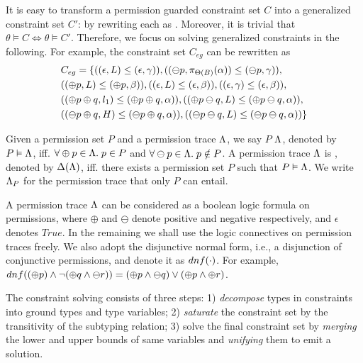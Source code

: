{{{It is easy to transform a permission guarded constraint set $C$ into a
generalized constraint set $C'$: by rewriting each  as .
Moreover, it is trivial that $\theta \vDash C \Longleftrightarrow \theta \vDash C'$.
Therefore, we focus on solving generalized constraints in the following.
For example, the constraint set $C_{eg}$ can be rewritten as
{\small
\begin{align*}
&C_{eg} = \{((\epsilon,L)\leq(\epsilon,\gamma)),
((\ominus p,\pi_{{\Theta(B)}}({\alpha}))\leq(\ominus p,\gamma)),\\
&((\oplus p,L)\leq(\oplus p,\beta)),
((\epsilon,L)\leq(\epsilon,\beta)),
((\epsilon,\gamma)\leq(\epsilon,\beta)),\\
&((\oplus p\oplus q,l_1)\leq(\oplus p\oplus q,\alpha)),
((\oplus p\ominus q,L)\leq(\oplus p\ominus q,\alpha)),\\
&((\ominus p\oplus q,H)\leq(\ominus p\oplus q,\alpha)),
((\ominus p\ominus q,L)\leq(\ominus p\ominus q,\alpha))\}
\end{align*}
}

Given a permission set $P$ and a permission trace $\Lambda$, we say $P$  $\Lambda$, denoted by $P \vDash \Lambda$, iff. $\forall \oplus p \in \Lambda. \; p\in P$ and $\forall \ominus p\in\Lambda.\; p\notin P$.
A permission trace $\Lambda$ is , denoted by $\Delta(\Lambda)$, iff. there exists a permission set $P$ such that $P\vDash \Lambda$.
We write $\Lambda_{P}$ for the permission trace that only $P$ can entail.

A permission trace $\Lambda$ can be considered as a boolean logic formula on permissions, where $\oplus$ and $\ominus$ denote positive and negative respectively, and $\epsilon$ denotes $True$.
In the remaining we shall use the logic connectives on permission traces freely.
We also adopt the disjunctive normal form, i.e., a disjunction of conjunctive permissions, and denote it as $dnf(\cdot)$. For example, $dnf((\oplus p) \land \neg (\oplus q \land \ominus r))  = (\oplus p \land \ominus q) \lor (\oplus p \land \oplus r) $.

The constraint solving consists of three steps: 1) \emph{decompose} types in constraints into ground types and type variables; 2) \emph{saturate} the constraint set by the transitivity of the subtyping relation; 3) solve the final constraint set by \emph{merging} the lower and upper bounds of same variables and \emph{unifying} them to emit a solution.


}}}
